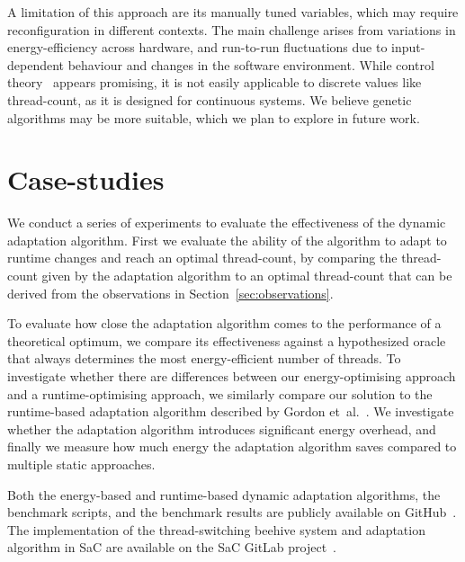 \documentclass[runningheads]{llncs}
\begin{document}
A limitation of this approach are its manually tuned variables, which may require reconfiguration in different contexts.
The main challenge arises from variations in energy-efficiency across hardware, and run-to-run fluctuations due to input-dependent behaviour and changes in the software environment.
While control theory~\cite{filieri2015software} appears promising, it is not easily applicable to discrete values like thread-count, as it is designed for continuous systems.
We believe genetic algorithms may be more suitable, which we plan to explore in future work.

\section{Case-studies}\label{sec:evaluation}
We conduct a series of experiments to evaluate the effectiveness of the dynamic adaptation algorithm.
First we evaluate the ability of the algorithm to adapt to runtime changes and reach an optimal thread-count, by comparing the thread-count given by the adaptation algorithm to an optimal thread-count that can be derived from the observations in Section~\ref{sec:observations}.

To evaluate how close the adaptation algorithm comes to the performance of a theoretical optimum, we compare its effectiveness against a hypothesized oracle that always determines the most energy-efficient number of threads.
To investigate whether there are differences between our energy-optimising approach and a runtime-optimising approach, we similarly compare our solution to the runtime-based adaptation algorithm described by Gordon et~al.~\cite{gordon2015dynamic}.
We investigate whether the adaptation algorithm introduces significant energy overhead, and finally we measure how much energy the adaptation algorithm saves compared to multiple static approaches.

Both the energy-based and runtime-based dynamic adaptation algorithms, the benchmark scripts, and the benchmark results are publicly available on GitHub~\cite{mtdynamic2024artefact}.
The implementation of the thread-switching beehive system and adaptation algorithm in SaC are available on the SaC GitLab project~\cite{mtdynamic2024repository}.
\end{document}
